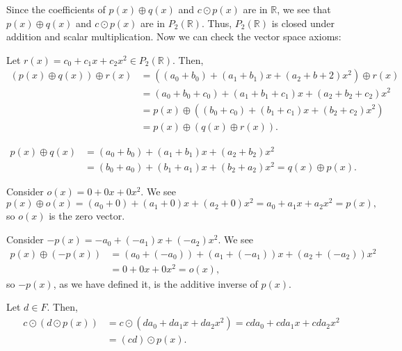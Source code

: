 \begin{solution}
Since the coefficients of $ p(x)\oplus q(x) $ and $ c\odot p(x) $ are in $ \mathbb{R} $, we see that $ p(x)\oplus q(x) $ and $ c\odot p(x) $ are in $ P_2(\mathbb{R}) $. Thus, $ P_2(\mathbb{R}) $ is closed under addition and scalar multiplication. Now we can check the vector space axioms:
\begin{enumerate}
    Let $ r(x)=c_0+c_1x+c_2x^2\in P_2(\mathbb{R}) $. Then,
    \begin{align*}
        (p(x)\oplus q(x))\oplus r(x) &= ((a_0+b_0)+(a_1+b_1)x+(a_2+b+2)x^2)\oplus r(x) \\
        &= (a_0+b_0+c_0)+(a_1+b_1+c_1)x+(a_2+b_2+c_2)x^2 \\
        &= p(x)\oplus((b_0+c_0)+(b_1+c_1)x+(b_2+c_2)x^2) \\
        &= p(x)\oplus(q(x)\oplus r(x)).
    \end{align*}

    \begin{align*}
        p(x)\oplus q(x) &= (a_0+b_0)+(a_1+b_1)x+(a_2+b_2)x^2 \\
        &= (b_0+a_0)+(b_1+a_1)x+(b_2+a_2)x^2=q(x)\oplus p(x).
    \end{align*}

    Consider $ o(x)=0+0x+0x^2 $. We see
    \begin{equation*}
        p(x)\oplus o(x)=(a_0+0)+(a_1+0)x+(a_2+0)x^2=a_0+a_1x+a_2x^2=p(x),
    \end{equation*}
    so $ o(x) $ is the zero vector.

    Consider $ -p(x)=-a_0+(-a_1)x+(-a_2)x^2 $. We see
    \begin{align*}
        p(x)\oplus(-p(x)) &= (a_0+(-a_0))+(a_1+(-a_1))x+(a_2+(-a_2))x^2 \\
        &= 0+0x+0x^2=o(x),
    \end{align*}
    so $ -p(x) $, as we have defined it, is the additive inverse of $ p(x) $.

    Let $ d\in F $. Then,
    \begin{align*}
        c\odot(d\odot p(x)) &= c\odot(da_0+da_1x+da_2x^2)=cda_0+cda_1x+cda_2x^2 \\
        &= (cd)\odot p(x).
    \end{align*}


\end{enumerate}
\end{solution}
